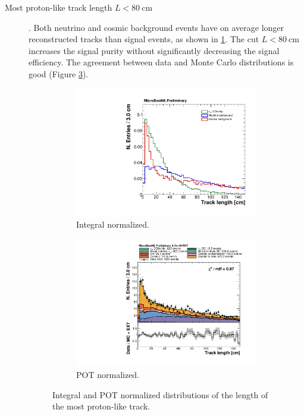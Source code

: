 \begin{description}
\item[Most proton-like track length $L < 80~\mathrm{cm}$]. Both neutrino and cosmic background events have on average longer reconstructed tracks than signal events, as shown in \ref{fig:length_norm}. The cut $L < 80~$cm increases the signal purity without significantly decreasing the signal efficiency. The agreement between data and Monte Carlo distributions is good (Figure \ref{fig:length_pot}).

\begin{figure}[htbp]
\centering
  \begin{subfigure}{0.45\textwidth}
    \includegraphics[width=\linewidth]{figures/h_track_length_norm.pdf}
    \caption{Integral normalized.} \label{fig:length_norm}
  \end{subfigure}
    \begin{subfigure}{0.45\textwidth}
    \includegraphics[width=\linewidth]{figures/h_track_length.pdf}
    \caption{POT normalized.} \label{fig:length_pot}
  \end{subfigure}
  \caption{Integral and POT normalized distributions of the length of the most proton-like track.}
\end{figure}

\end{description}

